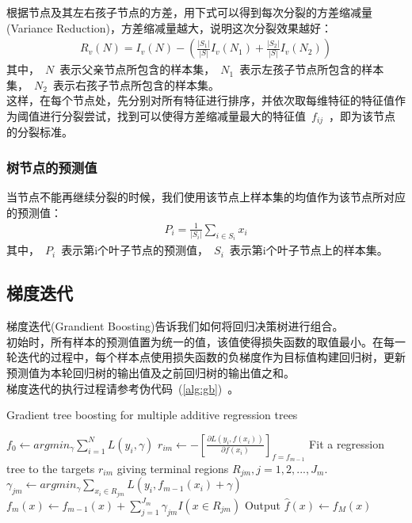 \documentclass[a4paper,11pt,         %
               ]{article}
\begin{document}
根据节点及其左右孩子节点的方差，用下式可以得到每次分裂的方差缩减量(Variance Reduction)，方差缩减量越大，说明这次分裂效果越好：
\begin{eqnarray}
R_{v}(N) = I_{v}(N) - \left ( \frac{\left | S_{1}\right |}{\left | S \right |} I_{v}\left ( N_{1} \right ) + \frac{\left | S_{2}\right |}{\left | S \right |} I_{v}\left ( N_{2} \right )\right)
\end{eqnarray}
其中，~$N$~表示父亲节点所包含的样本集，~$N_{1}$~表示左孩子节点所包含的样本集，~$N_{2}$~表示右孩子节点所包含的样本集。
\\

这样，在每个节点处，先分别对所有特征进行排序，并依次取每维特征的特征值作为阈值进行分裂尝试，找到可以使得方差缩减量最大的特征值~$f_{ij}$~，即为该节点的分裂标准。 

\subsubsection{树节点的预测值}

当节点不能再继续分裂的时候，我们使用该节点上样本集的均值作为该节点所对应的预测值：
\begin{eqnarray}
P_{i} = \frac{1}{\left | S_{i} \right |} \sum_{i \in S_{i}} x_{i}
\end{eqnarray}
其中，~$P_{i}$~表示第i个叶子节点的预测值，~$S_{i}$~表示第i个叶子节点上的样本集。

\subsection{梯度迭代}
梯度迭代(Grandient Boosting)告诉我们如何将回归决策树进行组合。 \\

初始时，所有样本的预测值置为统一的值，该值使得损失函数的取值最小。在每一轮迭代的过程中，每个样本点使用损失函数的负梯度作为目标值构建回归树，更新预测值为本轮回归树的输出值及之前回归树的输出值之和。 \\

梯度迭代的执行过程请参考伪代码~(\ref{alg:gb})~。

\begin{algorithm}
	\caption{Gradient tree boosting for multiple additive regression trees}
	\label{alg:gb}
	\begin{algorithmic}[1] %
	\State $f_{0} \gets argmin_{\gamma} \sum_{i = 1}^{N} L \left ( y_{i}, \gamma\right )$
			\State $r_{im} \gets -\left [ \frac{\partial L\left ( y_{i}, f\left ( x_{i} \right ) \right )}{\partial f\left ( x_{i} \right )} \right ]_{f=f_{m-1}}$			
		\EndFor
		\State Fit a regression tree to the targets $r_{im}$ giving terminal regions $R_{jm}, j = 1,2,...,J_{m}$.
			\State $\gamma_{jm} \gets argmin_{\gamma} \sum_{x_{i} \in R_{jm}} L\left ( y_{i},f_{m-1}\left ( x_{i} \right ) + \gamma \right )$
		\EndFor
		\State $f_{m}\left ( x \right ) \gets f_{m-1}\left ( x \right ) + \sum_{j=1}^{J_{m}} \gamma_{jm}I\left ( x \in R_{jm} \right )$
		\label{alg:gb:update}
	\EndFor
	\State Output $\hat{f}\left ( x \right ) \gets f_{M}\left ( x \right )$
	\end{algorithmic}
\end{algorithm}
\end{document}
